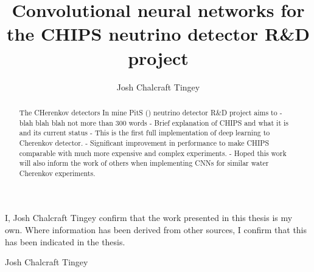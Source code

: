 
\title{Convolutional neural networks for the CHIPS neutrino detector R\&D project}
\author{Josh Chalcraft Tingey}

\thispagestyle{plain}

\begin{declaration} %
    I, Josh Chalcraft Tingey confirm that the work presented in this thesis is my own. Where
    information has been derived from other sources, I confirm that this has been indicated in the
    thesis.
    \vspace*{1cm}
    \begin{flushright}
        Josh Chalcraft Tingey
    \end{flushright}
\end{declaration}

\begin{abstract} %
    The CHerenkov detectors In mine PitS (\chips) neutrino detector R\&D project aims to
    - blah blah blah not more than 300 words
    - Brief explanation of CHIPS and what it is and its current status
    - This is the first full implementation of deep learning to Cherenkov detector.
    - Significant improvement in performance to make CHIPS comparable with much more expensive and
    complex experiments.
    - Hoped this work will also inform the work of others when implementing CNNs for similar water
    Cherenkov experiments.
\end{abstract}

